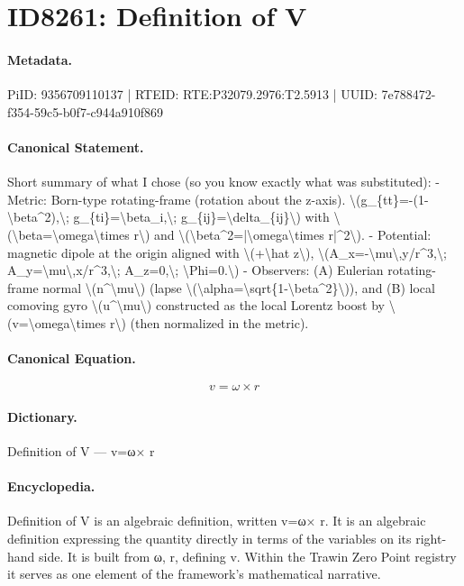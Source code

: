 \section*{ID8261: Definition of V}
\paragraph{Metadata.}
PiID: 9356709110137 | RTEID: RTE:P32079.2976:T2.5913 | UUID: 7e788472-f354-59c5-b0f7-c944a910f869

\paragraph{Canonical Statement.}
Short summary of what I chose (so you know exactly what was substituted): - Metric: Born-type rotating-frame (rotation about the z-axis). \textbackslash{}(g\_\{tt\}=-(1-\textbackslash{}beta\textasciicircum{}2),\textbackslash{}; g\_\{ti\}=\textbackslash{}beta\_i,\textbackslash{}; g\_\{ij\}=\textbackslash{}delta\_\{ij\}\textbackslash{}) with \textbackslash{}(\textbackslash{}beta=\textbackslash{}omega\textbackslash{}times r\textbackslash{}) and \textbackslash{}(\textbackslash{}beta\textasciicircum{}2=|\textbackslash{}omega\textbackslash{}times r|\textasciicircum{}2\textbackslash{}). - Potential: magnetic dipole at the origin aligned with \textbackslash{}(+\textbackslash{}hat z\textbackslash{}), \textbackslash{}(A\_x=-\textbackslash{}mu\textbackslash{},y/r\textasciicircum{}3,\textbackslash{}; A\_y=\textbackslash{}mu\textbackslash{},x/r\textasciicircum{}3,\textbackslash{}; A\_z=0,\textbackslash{}; \textbackslash{}Phi=0.\textbackslash{}) - Observers: (A) Eulerian rotating-frame normal \textbackslash{}(n\textasciicircum{}\textbackslash{}mu\textbackslash{}) (lapse \textbackslash{}(\textbackslash{}alpha=\textbackslash{}sqrt\{1-\textbackslash{}beta\textasciicircum{}2\}\textbackslash{})), and (B) local comoving gyro \textbackslash{}(u\textasciicircum{}\textbackslash{}mu\textbackslash{}) constructed as the local Lorentz boost by \textbackslash{}(v=\textbackslash{}omega\textbackslash{}times r\textbackslash{}) (then normalized in the metric).

\paragraph{Canonical Equation.}
\[
v=\omega\times r
\]

\paragraph{Dictionary.}
Definition of V — v=ω× r

\paragraph{Encyclopedia.}
Definition of V is an algebraic definition, written v=ω× r. It is an algebraic definition expressing the quantity directly in terms of the variables on its right-hand side. It is built from ω, r, defining v. Within the Trawin Zero Point registry it serves as one element of the framework's mathematical narrative.
